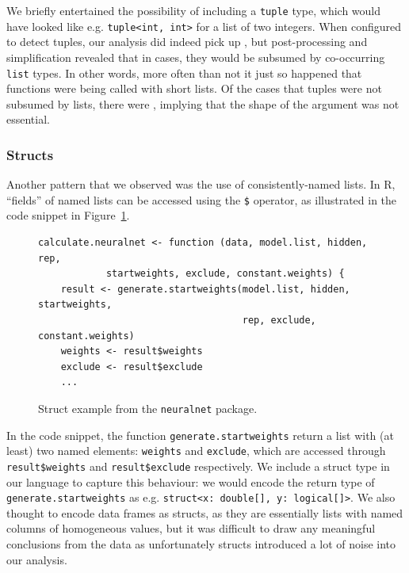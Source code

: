\documentclass[acmsmall,review,anonymous]{acmart}\settopmatter{printfolios=true,printccs=false,printacmref=false}
\newcommand{\code}[1]{{\lstinline[style=Rin]!#1!}\xspace}
\begin{document}
We briefly entertained the possibility of including a \code{tuple} type, which would have looked like e.g. \code{tuple<int, int>} for a list of two integers.  
When configured to detect tuples, our analysis did indeed pick up , but post-processing and simplification revealed that in  cases, they would be subsumed by co-occurring \code{list} types.
In other words, more often than not it just so happened that functions were being called with short lists.  
Of the cases that tuples were not subsumed by lists,  there were , implying that the shape of the argument was not essential.


%
%
\subsubsection{Structs}


Another pattern that we observed was the use of consistently-named lists.
In R, ``fields'' of named lists can be accessed using the \code{$} operator, as illustrated in the code snippet in Figure~\ref{fig:struct-ex}.

\begin{figure}[htbp]
\begin{center}

\begin{lstlisting}
calculate.neuralnet <- function (data, model.list, hidden, rep,
            startweights, exclude, constant.weights) {
    result <- generate.startweights(model.list, hidden, startweights,
                                    rep, exclude, constant.weights)
    weights <- result$weights
    exclude <- result$exclude
    ...
\end{lstlisting}

\caption{Struct example from the \code{neuralnet} package.}
\label{fig:struct-ex}
\end{center}
\end{figure}

In the code snippet, the function \code{generate.startweights} return a list with (at least) two named elements: \code{weights} and \code{exclude}, which are accessed through \code{result$weights} and \code{result$exclude} respectively.
We include a struct type in our language to capture this behaviour: we would encode the return type of \code{generate.startweights} as e.g. \code{struct<x: double[], y: logical[]>}.  
We also thought to encode data frames as structs, as they are essentially lists with named columns of homogeneous values, but it was difficult to draw any meaningful conclusions from the data as unfortunately structs introduced a lot of noise into our analysis.
\end{document}
